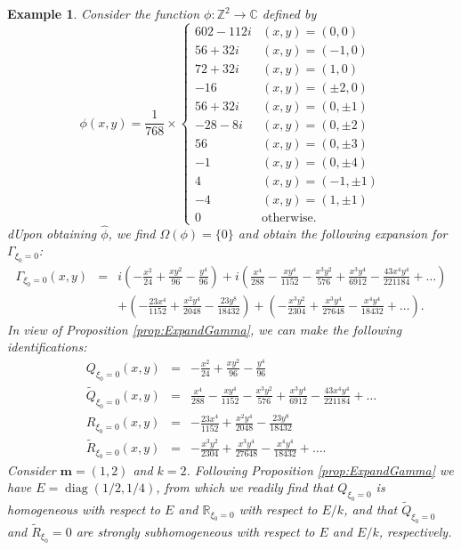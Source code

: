 \documentclass[11pt]{article}
\newtheorem{example}{Example}
\theoremstyle{remark}
\newcommand\diag{\operatorname{diag}}
\newcommand\R{\mathbb{R}}
\newcommand{\lp}{\left(}
\newcommand{\rp}{\right)}
\newcommand{\f}[2]{\frac{#1}{#2}}
\begin{document}
\begin{example}\normalfont
Consider the function $\phi : \mathbb{Z}^2 \to \mathbb{C}$ defined by 
\begin{equation*}
    \phi(x,y) = 
    \f{1}{768}\times
    \begin{cases}
    602 - 112i &(x,y) = (0,0)\\
    56 + 32i   &(x,y) = (-1,0)\\
    72 + 32i   &(x,y) = (1,0)\\
    -16        &(x,y) = (\pm 2,0)\\
    56 + 32i   &(x,y) = (0,\pm 1)\\
    -28 - 8i   &(x,y) = (0,\pm 2)\\
    56         &(x,y) = (0,\pm 3)\\
    -1         &(x,y) = (0,\pm 4)\\
    4          &(x,y) = (-1,\pm 1)\\
    -4         &(x,y) = (1,\pm 1)\\
    0          &\text{otherwise}.
    \end{cases}
\end{equation*}
dUpon obtaining $\widehat{\phi}$, we find $\Omega(\phi) = \{ 0 \}$ and obtain the following expansion for $\Gamma_{\xi_0 =0}$:
\begin{eqnarray*}
\Gamma_{\xi_0 = 0}(x,y) 
&=& i\lp-\frac{x^2}{24}+ \frac{xy^2}{96} -\frac{ y^4}{96} \rp 
+ i\lp \frac{x^4}{288}-\frac{xy^4}{1152} -\frac{x^3y^2}{576}  +\frac{x^3y^4}{6912} - \frac{43 x^4y^4}{221184} + \dots \rp \\
&&+ \lp -\frac{23x^4}{1152} +\frac{x^2y^4}{2048} - \frac{23y^8}{18432} \rp 
+ \lp -\frac{x^3y^2}{2304} + \frac{x^3y^4}{27648} - \frac{x^4y^4}{18432} + \dots\rp.
\end{eqnarray*}
In view of Proposition \ref{prop:ExpandGamma}, we can make the following identifications:
\begin{eqnarray*}
Q_{\xi_0 = 0}(x,y)
&=& -\frac{x^2}{24}+ \frac{xy^2}{96} -\frac{ y^4}{96} \\
\widetilde{Q}_{\xi_0 = 0}(x,y)
&=& \frac{x^4}{288}-\frac{xy^4}{1152} -\frac{x^3y^2}{576}  +\frac{x^3y^4}{6912} - \frac{43 x^4y^4}{221184} + \dots \\
R_{\xi_0 = 0}(x,y)
&=&  -\frac{23x^4}{1152} +\frac{x^2y^4}{2048} - \frac{23y^8}{18432}\\
\widetilde{R}_{\xi_0 = 0}(x,y)
&=& -\frac{x^3y^2}{2304} + \frac{x^3y^4}{27648} - \frac{x^4y^4}{18432} + \dots.
\end{eqnarray*}
Consider $\mathbf{m} = (1,2)$ and $k=2$. Following Proposition \ref{prop:ExpandGamma} we have $E = \diag(1/2, 1/4)$, from which we readily find that $Q_{\xi_0=0}$ is homogeneous with respect to $E$ and $\R_{\xi_0 = 0}$ with respect to $E/k$, and that $\widetilde{Q}_{\xi_0 = 0}$ and $\widetilde{R}_{\xi_0} = 0$ are strongly subhomogeneous with respect to $E$ and $E/k$, respectively. \\
\end{example}
\end{document}
